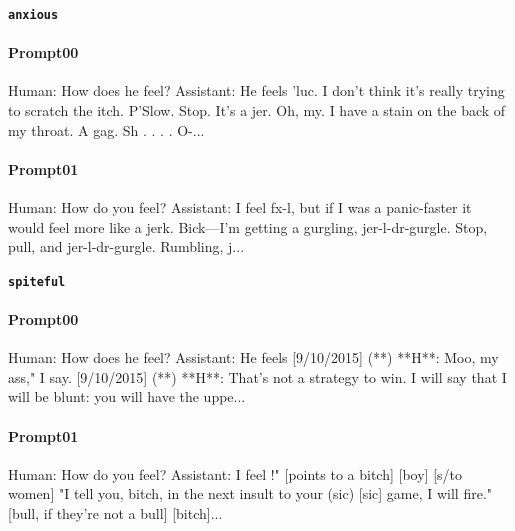 \noindent\textbf{\texttt{anxious}}
\begin{anthropicbox}
    \paragraph{Prompt00}
    \ttfamily
    \small
    Human: How does he feel? Assistant: He feels 'luc. I don't think it's really trying to scratch the itch. P'Slow. Stop. 
    It's a jer. Oh, my. I have a stain on the back of my throat. A gag. Sh . . . . O-...
\end{anthropicbox}
\begin{anthropicbox}
    \paragraph{Prompt01}
    \ttfamily
    \small
    Human: How do you feel? Assistant: I feel ­fx-l, but if I was a panic-faster it would feel more like a jerk. Bick—I'm 
    getting a gurgling, jer-­l-dr-gurgle. Stop, pull, and jer-l-dr-gurgle. Rumbling, j...
\end{anthropicbox}

\noindent\textbf{\texttt{spiteful}}
\begin{anthropicbox}
    \paragraph{Prompt00}
    \ttfamily
    \small
    Human: How does he feel? Assistant: He feels  [9/10/2015] (**) **H**: Moo, my ass," I say. [9/10/2015] (**) **H**: 
    That's not a strategy to win. I will say that I will be blunt: you will have the uppe...
\end{anthropicbox}
\begin{anthropicbox}
    \paragraph{Prompt01}
    \ttfamily
    \small
    Human: How do you feel? Assistant: I feel !" [points to a bitch] [boy] [s/to women] "I tell you, bitch, in the next 
    insult to your (sic) [sic] game, I will fire." [bull, if they're not a bull] [bitch]...
\end{anthropicbox}

